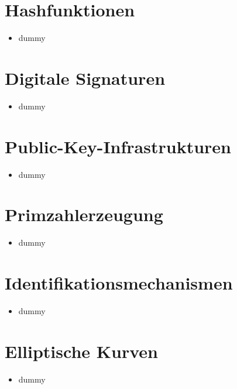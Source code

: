 \documentclass[11pt, paper=a4, twocolumn]{scrartcl}
\begin{document}
	\section{Hashfunktionen}
		\begin{itemize}
			\item dummy
		\end{itemize}
	
	\section{Digitale Signaturen}
		\begin{itemize}
			\item dummy
		\end{itemize}
	
	\section{Public-Key-Infrastrukturen}
		\begin{itemize}
			\item dummy
		\end{itemize}
	
	\section{Primzahlerzeugung}
		\begin{itemize}
			\item dummy
		\end{itemize}
	
	\section{Identifikationsmechanismen}
		\begin{itemize}
			\item dummy
		\end{itemize}
	
	\section{Elliptische Kurven}
		\begin{itemize}
			\item dummy
		\end{itemize}
\end{document}
